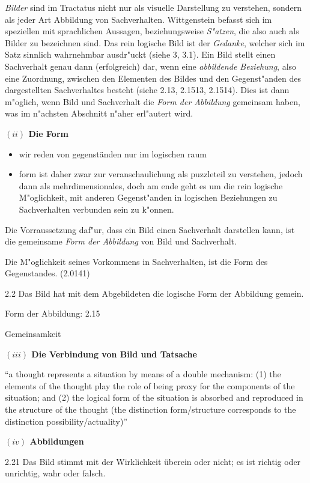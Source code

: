 \documentclass[a4paper, emulatestandardclasses, 12pt]{scrartcl}
\begin{document}
\begin{onehalfspace}
\emph{Bilder} sind im Tractatus nicht nur als visuelle Darstellung zu verstehen, sondern als jeder Art Abbildung von Sachverhalten. Wittgenstein befasst sich im speziellen mit sprachlichen Aussagen, beziehungsweise \emph{S"atzen}, die also auch als Bilder zu bezeichnen sind. Das rein logische Bild ist der \emph{Gedanke}, welcher sich im Satz sinnlich wahrnehmbar ausdr"uckt (siehe 3, 3.1). Ein Bild stellt einen Sachverhalt genau dann (erfolgreich) dar, wenn eine \emph{abbildende Beziehung}, also eine Zuordnung, zwischen den Elementen des Bildes und den Gegenst"anden des dargestellten Sachverhaltes besteht (siehe 2.13, 2.1513, 2.1514). Dies ist dann m"oglich, wenn Bild und Sachverhalt die \emph{Form der Abbildung} gemeinsam haben, was im n"achsten Abschnitt n"aher erl"autert wird. 


\vspace{5mm}
\noindent\textbf{$(ii)$ Die Form}	

\noindent 

\begin{itemize}
  \item wir reden von gegenständen nur im logischen raum
  \item form ist daher zwar zur veranschaulichung als puzzleteil zu verstehen, jedoch dann als mehrdimensionales, doch am ende geht es um die rein logische M"oglichkeit, mit anderen Gegenst"anden in logischen Beziehungen zu Sachverhalten verbunden sein zu k"onnen.
\end{itemize}



Die Vorraussetzung daf"ur, dass ein Bild einen Sachverhalt darstellen kann, ist die gemeinsame \emph{Form der Abbildung} von Bild und Sachverhalt. 


Die M"oglichkeit seines Vorkommens in Sachverhalten, ist die Form des Gegenstandes. (2.0141)

2.2
Das Bild hat mit dem Abgebildeten die logische Form der Abbildung gemein.

Form der Abbildung: 2.15

Gemeinsamkeit

\vspace{5mm}
\noindent\textbf{$(iii)$ Die Verbindung von Bild und Tatsache}	

\noindent "`a thought represents a situation by means of a double mechanism: (1) the elements of the thought play the role of being proxy for the components of the situation; and (2) the logical form of the situation is absorbed and reproduced in the structure of the thought (the distinction form/structure corresponds to the distinction possibility/actuality)"' \cite[S.46]{frascolla2007understanding}


\vspace{5mm}
\noindent\textbf{$(iv)$ Abbildungen}	

2.21
Das Bild stimmt mit der Wirklichkeit überein oder nicht; es ist richtig oder unrichtig, wahr oder falsch.

\end{onehalfspace}
\nocite{*}

\end{document}
